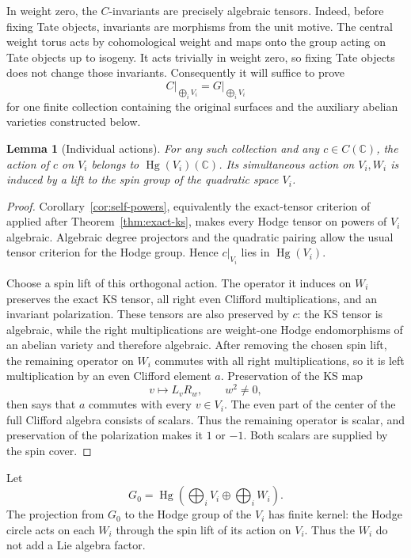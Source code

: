 \documentclass[11pt]{article}
\numberwithin{equation}{section}
\newtheorem{lemma}[theorem]{Lemma}
\theoremstyle{definition}
\theoremstyle{remark}
\newcommand{\C}{\mathbb C}
\DeclareMathOperator{\Hg}{Hg}
\begin{document}
In weight zero, the $C$-invariants are precisely algebraic tensors.
Indeed, before fixing Tate objects, invariants are morphisms from the
unit motive.  The central weight torus acts by cohomological weight and
maps onto the group acting on Tate objects up to isogeny.  It acts
trivially in weight zero, so fixing Tate objects does not change those
invariants.  Consequently it will suffice to prove
\begin{equation}\label{eq:mixed-group-goal}
 C\big|_{\bigoplus_i V_i}=G\big|_{\bigoplus_i V_i}
\end{equation}
for one finite collection containing the original surfaces and the
auxiliary abelian varieties constructed below.

\begin{lemma}[Individual actions]\label{lem:mixed-individual}
For any such collection and any $c\in C(\C)$, the action of $c$ on $V_i$
belongs to $\Hg(V_i)(\C)$.  Its simultaneous action on $V_i,W_i$ is
induced by a lift to the spin group of the quadratic space $V_i$.
\end{lemma}

\begin{proof}
Corollary~\ref{cor:self-powers}, equivalently the exact-tensor criterion
of \cite[Theorem~1.1]{AKS} applied after
Theorem~\ref{thm:exact-ks}, makes every Hodge tensor on powers of $V_i$
algebraic.  Algebraic degree projectors and the quadratic pairing allow
the usual tensor criterion for the Hodge group.  Hence $c|_{V_i}$ lies
in $\Hg(V_i)$.

Choose a spin lift of this orthogonal action.  The operator it induces
on $W_i$ preserves the exact KS tensor, all right even Clifford
multiplications, and an invariant polarization.  These tensors are
also preserved by $c$: the KS tensor is algebraic, while the right
multiplications are weight-one Hodge endomorphisms of an abelian
variety and therefore algebraic.  After removing the chosen spin lift,
the remaining operator on $W_i$ commutes with all right multiplications,
so it is left multiplication by an even Clifford element $a$.
Preservation of the KS map
\[
 v\longmapsto L_vR_w,\qquad w^2\ne0,
\]
then says that $a$ commutes with every $v\in V_i$.  The even part of
the center of the full Clifford algebra consists of scalars.  Thus the
remaining operator is scalar, and preservation of the polarization
makes it $1$ or $-1$.  Both scalars are supplied by the spin cover.
\end{proof}

Let
\[
 G_0=\Hg\left(\bigoplus_i V_i\oplus\bigoplus_i W_i\right).
\]
The projection from $G_0$ to the Hodge group of the $V_i$ has finite
kernel: the Hodge circle acts on each $W_i$ through the spin lift of
its action on $V_i$.  Thus the $W_i$ do not add a Lie algebra factor.
\end{document}
